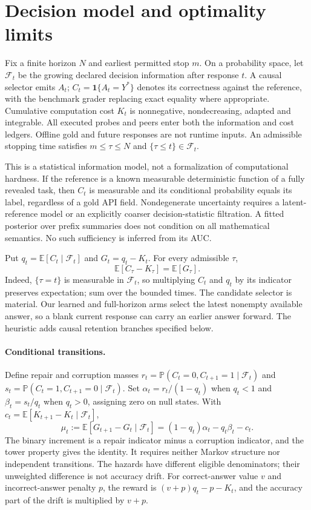 \documentclass{article}
\newcommand{\E}{\mathbb E}
\newcommand{\PP}{\mathbb P}
\newcommand{\F}{\mathcal F}
\newcommand{\ind}{\mathbf 1}
\begin{document}
\section{Decision model and optimality limits}
\label{sec:theory}
Fix a finite horizon \(N\) and earliest permitted stop \(m\). On a probability
space, let \(\F_t\) be the growing declared decision information after response
\(t\). A causal selector emits \(A_t\); \(C_t=\ind\{A_t=Y^*\}\) denotes its
correctness against the reference, with the benchmark grader replacing exact
equality where appropriate. Cumulative computation cost \(K_t\) is nonnegative,
nondecreasing, adapted and integrable. All executed probes and peers enter both
the information and cost ledgers. Offline gold and future responses are not
runtime inputs. An admissible stopping time satisfies
\(m\le\tau\le N\) and \(\{\tau\le t\}\in\F_t\).

This is a statistical information model, not a formalization of computational
hardness. If the reference is a known measurable deterministic function of a
fully revealed task, then \(C_t\) is measurable and its conditional probability
equals its label, regardless of a gold API field. Nondegenerate uncertainty
requires a latent-reference model or an explicitly coarser decision-statistic
filtration. A fitted posterior over prefix summaries does not condition on all
mathematical semantics. No such sufficiency is inferred from its AUC.

Put \(q_t=\E[C_t\mid\F_t]\) and \(G_t=q_t-K_t\). For every admissible \(\tau\),
\begin{equation}
 \E[C_\tau-K_\tau]=\E[G_\tau].
 \label{eq:reduction}
\end{equation}
Indeed, \(\{\tau=t\}\) is measurable in \(\F_t\), so multiplying \(C_t\) and
\(q_t\) by its indicator preserves expectation; sum over the bounded times.
The candidate selector is material. Our learned and full-horizon arms select
the latest nonempty available answer, so a blank current response can carry
an earlier answer forward. The heuristic adds causal retention branches
specified below.

\paragraph{Conditional transitions.}
Define repair and corruption masses
\(r_t=\PP(C_t=0,C_{t+1}=1\mid\F_t)\) and
\(s_t=\PP(C_t=1,C_{t+1}=0\mid\F_t)\).
Set \(\alpha_t=r_t/(1-q_t)\) when \(q_t<1\) and
\(\beta_t=s_t/q_t\) when \(q_t>0\), assigning zero on null states. With
\(c_t=\E[K_{t+1}-K_t\mid\F_t]\),
\begin{equation}
 \mu_t:=\E[G_{t+1}-G_t\mid\F_t]
       =(1-q_t)\alpha_t-q_t\beta_t-c_t .
 \label{eq:drift}
\end{equation}
The binary increment is a repair indicator minus a corruption indicator, and
the tower property gives the identity. It requires neither Markov structure
nor independent transitions. The hazards have different eligible denominators;
their unweighted difference is not accuracy drift. For correct-answer value
\(v\) and incorrect-answer penalty \(p\), the reward is
\((v+p)q_t-p-K_t\), and the accuracy part of the drift is multiplied by \(v+p\).
\end{document}
